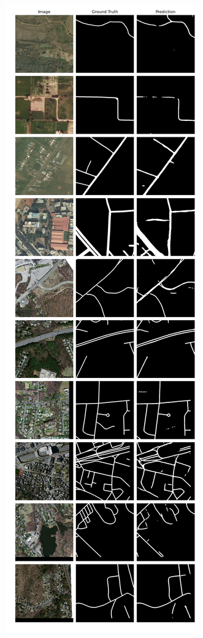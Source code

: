\begin{figure}
	\centering
	\begin{minipage}{.41\textwidth}
		\centering
		\includegraphics[width=1.\linewidth]{Bilder/Samples-Combined/bunet2.png}

\end{minipage}
\end{figure}
